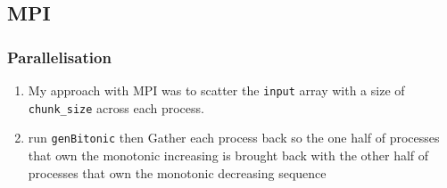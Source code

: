 \subsection{MPI}
\subsubsection*{Parallelisation}
\begin{enumerate}
	\item My approach with MPI was to scatter the \texttt{input} array with a size of \texttt{chunk\_size} across each process.
	\item run \texttt{genBitonic} then Gather each process back so the one half of processes that own the monotonic increasing is brought back with the other half of processes that own the monotonic decreasing sequence
\end{enumerate}
